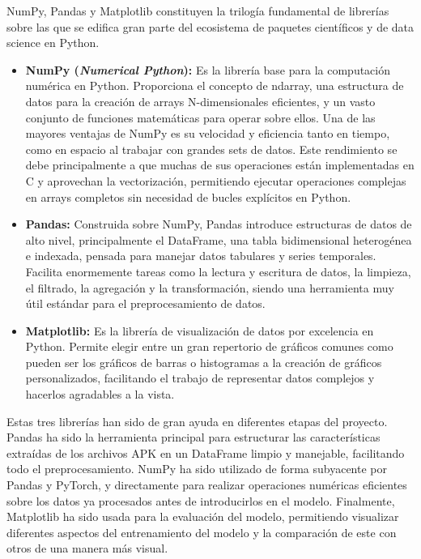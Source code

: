 
NumPy, Pandas y Matplotlib constituyen la trilogía fundamental de librerías sobre las que se edifica gran parte del ecosistema de paquetes científicos y de data science en Python.

\begin{itemize}
	\item \textbf{NumPy (\textit{Numerical Python}):} Es la librería base para la computación numérica en Python. Proporciona el concepto de ndarray, una estructura de datos para la creación de arrays N-dimensionales eficientes, y un vasto conjunto de funciones matemáticas para operar sobre ellos. Una de las mayores ventajas de NumPy es su velocidad y eficiencia tanto en tiempo, como en espacio al trabajar con grandes sets de datos. Este rendimiento se debe principalmente a que muchas de sus operaciones están implementadas en C y aprovechan la vectorización, permitiendo ejecutar operaciones complejas en arrays completos sin necesidad de bucles explícitos en Python.
	
	\item \textbf{Pandas:} Construida sobre NumPy, Pandas introduce estructuras de datos de alto nivel, principalmente el DataFrame, una tabla bidimensional heterogénea e indexada, pensada para manejar datos tabulares y series temporales. Facilita enormemente tareas como la lectura y escritura de datos, la limpieza, el filtrado, la agregación y la transformación, siendo una herramienta muy útil estándar para el preprocesamiento de datos.

	\item \textbf{Matplotlib:} Es la librería de visualización de datos por excelencia en Python. Permite elegir entre un gran repertorio de gráficos comunes como pueden ser los gráficos de barras o histogramas a la creación de gráficos personalizados, facilitando el trabajo de representar datos complejos y hacerlos agradables a la vista.
	
\end{itemize}

Estas tres librerías han sido de gran ayuda en diferentes etapas del proyecto. Pandas ha sido la herramienta principal para estructurar las características extraídas de los archivos APK en un DataFrame limpio y manejable, facilitando todo el preprocesamiento. NumPy ha sido utilizado de forma subyacente por Pandas y PyTorch, y directamente para realizar operaciones numéricas eficientes sobre los datos ya procesados antes de introducirlos en el modelo. Finalmente, Matplotlib ha sido usada para la evaluación del modelo, permitiendo visualizar diferentes aspectos del entrenamiento del modelo y la comparación de este con otros de una manera más visual.

